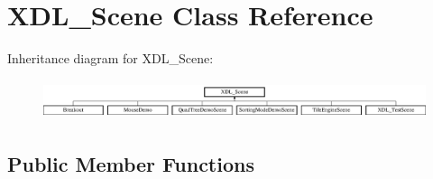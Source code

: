 \hypertarget{class_x_d_l___scene}{\section{X\-D\-L\-\_\-\-Scene Class Reference}
\label{class_x_d_l___scene}
}
Inheritance diagram for X\-D\-L\-\_\-\-Scene\-:\begin{figure}[H]
\begin{center}
\leavevmode
\includegraphics[height=1.166667cm]{class_x_d_l___scene}
\end{center}
\end{figure}
\subsection*{Public Member Functions}
